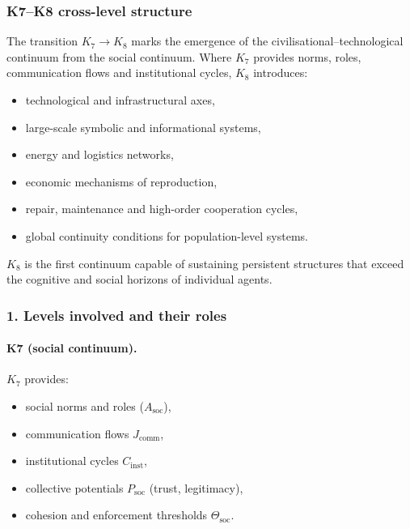 
\subsubsection{K7–K8 cross-level structure}
\label{sec:crossk-k7-k8}

The transition $K_7 \rightarrow K_8$ marks the emergence of the
civilisational–technological continuum from the social continuum.
Where $K_7$ provides norms, roles, communication flows and institutional
cycles, $K_8$ introduces:
\begin{itemize}
  \item technological and infrastructural axes,
  \item large-scale symbolic and informational systems,
  \item energy and logistics networks,
  \item economic mechanisms of reproduction,
  \item repair, maintenance and high-order cooperation cycles,
  \item global continuity conditions for population-level systems.
\end{itemize}

$K_8$ is the first continuum capable of sustaining persistent structures
that exceed the cognitive and social horizons of individual agents.

\subsubsection{1. Levels involved and their roles}

\paragraph{K7 (social continuum).}
$K_7$ provides:
\begin{itemize}
  \item social norms and roles ($A_{\mathrm{soc}}$),
  \item communication flows $J_{\mathrm{comm}}$,
  \item institutional cycles $C_{\mathrm{inst}}$,
  \item collective potentials $P_{\mathrm{soc}}$ (trust, legitimacy),
  \item cohesion and enforcement thresholds $\Theta_{\mathrm{soc}}$.
\end{itemize}

